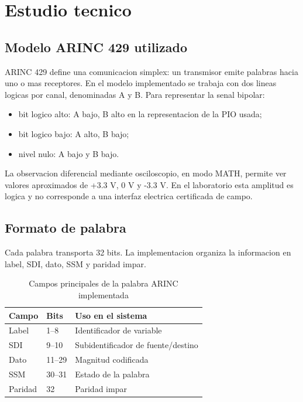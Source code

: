 \documentclass[12pt,a4paper,oneside]{report}
\begin{document}
\chapter{Estudio tecnico}

\section{Modelo ARINC 429 utilizado}

ARINC 429 define una comunicacion simplex: un transmisor emite palabras hacia
uno o mas receptores. En el modelo implementado se trabaja con dos lineas
logicas por canal, denominadas A y B. Para representar la senal bipolar:

\begin{itemize}
  \item bit logico alto: A bajo, B alto en la representacion de la PIO usada;
  \item bit logico bajo: A alto, B bajo;
  \item nivel nulo: A bajo y B bajo.
\end{itemize}

La observacion diferencial mediante osciloscopio, en modo MATH, permite ver
valores aproximados de +3.3 V, 0 V y -3.3 V. En el laboratorio esta amplitud es
logica y no corresponde a una interfaz electrica certificada de campo.

\section{Formato de palabra}

Cada palabra transporta 32 bits. La implementacion organiza la informacion en
label, SDI, dato, SSM y paridad impar.

\begin{table}[H]
\centering
\caption{Campos principales de la palabra ARINC implementada}
\begin{tabular}{lll}
\toprule
Campo & Bits & Uso en el sistema \\
\midrule
Label & 1--8 & Identificador de variable \\
SDI & 9--10 & Subidentificador de fuente/destino \\
Dato & 11--29 & Magnitud codificada \\
SSM & 30--31 & Estado de la palabra \\
Paridad & 32 & Paridad impar \\
\bottomrule
\end{tabular}
\end{table}
\end{document}
